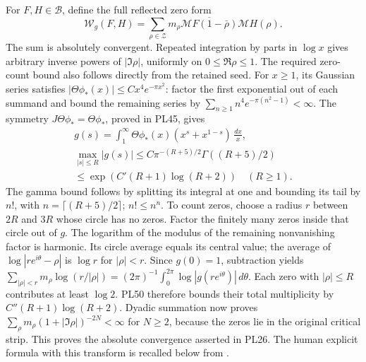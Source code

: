 \documentclass[11pt,a4paper]{article}
\theoremstyle{definition}\newtheorem{definition}[theorem]{Definition}
\begin{document}
For \(F,H\in\mathscr B\), define the full reflected zero form
\[
 \mathcal W_g(F,H)=
 \sum_{\rho\in\mathscr Z}m_\rho
    \overline{\mathcal M F(1-\bar\rho)}\mathcal M H(\rho).
 \tag{PL26}\label{pl:pl:Weil}
\]
The sum is absolutely convergent. Repeated integration by parts in
\(\log x\) gives arbitrary inverse powers of \(|\Im\rho|\), uniformly
on \(0\le\Re\rho\le1\). The required zero-count bound also follows
directly from the retained seed. For \(x\ge1\), its Gaussian series
satisfies \(|\Theta\phi_*(x)|\le Cx^4e^{-\pi x^2}\): factor the first
exponential out of each summand and bound the remaining series by
\(\sum_{n\ge1}n^4e^{-\pi(n^2-1)}<\infty\).
The symmetry \(J\Theta\phi_*=\Theta\phi_*\), proved in PL45, gives
\[
 \begin{gathered}
 g(s)=\int_1^\infty\Theta\phi_*(x)(x^s+x^{1-s})\,\frac{dx}{x},
 \\
 \max_{|s|\le R}|g(s)|
 \le C\pi^{-(R+5)/2}\Gamma((R+5)/2)
 \\
 \le \exp(C'(R+1)\log(R+2))\quad(R\ge1).
 \end{gathered}
 \tag{PL50}\label{pl:pl:g-growth}
\]
The gamma bound follows by splitting its integral at one and
bounding its tail by \(n!\), with \(n=\lceil(R+5)/2\rceil\);
\(n!\le n^n\). To count zeros, choose a radius \(r\) between
\(2R\) and \(3R\) whose circle has no zeros. Factor the finitely
many zeros inside that circle out of \(g\). The logarithm of the
modulus of the remaining nonvanishing factor is harmonic.
Its circle average equals its central value; the average of
\(\log|re^{i\theta}-\rho|\) is \(\log r\) for \(|\rho|<r\).
Since \(g(0)=1\), subtraction yields
\(\sum_{|\rho|<r}m_\rho\log(r/|\rho|)
=(2\pi)^{-1}\int_0^{2\pi}\log|g(re^{i\theta})|\,d\theta\).
Each zero with \(|\rho|\le R\) contributes at least \(\log2\).
PL50 therefore bounds their total multiplicity by
\(C''(R+1)\log(R+2)\).
Dyadic summation now proves
\(\sum_\rho m_\rho(1+|\Im\rho|)^{-2N}<\infty\) for \(N\ge2\),
because the zeros lie in the original critical strip.
This proves the absolute convergence asserted in PL26.
The human explicit formula with this transform is recalled below
from \cite{PLConnes}.
\end{document}
